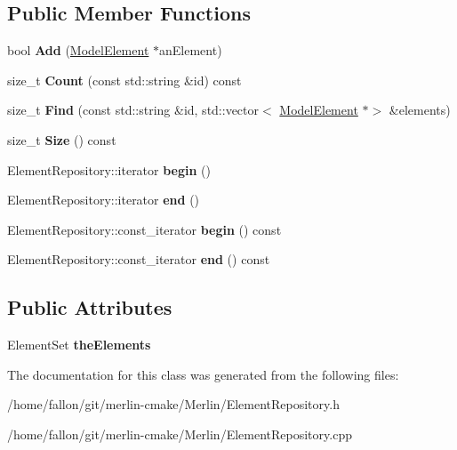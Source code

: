 \subsection*{Public Member Functions}
\begin{DoxyCompactItemize}
\item 
\mbox{\label{classElementRepository_a5c7dee409a53d501144a9cf5c6200e1e}} 
bool {\bfseries Add} (\hyperlink{classModelElement}{Model\+Element} $\ast$an\+Element)
\item 
\mbox{\label{classElementRepository_a48528e41abe5ed8a121db383ead83f63}} 
size\+\_\+t {\bfseries Count} (const std\+::string \&id) const
\item 
\mbox{\label{classElementRepository_ae8833698c1c4efa1fffd01547d9166dd}} 
size\+\_\+t {\bfseries Find} (const std\+::string \&id, std\+::vector$<$ \hyperlink{classModelElement}{Model\+Element} $\ast$$>$ \&elements)
\item 
\mbox{\label{classElementRepository_a3fc873824d592ab3a60964de5f32691f}} 
size\+\_\+t {\bfseries Size} () const
\item 
\mbox{\label{classElementRepository_a064256ae32d76ad39d96c931ab672b84}} 
Element\+Repository\+::iterator {\bfseries begin} ()
\item 
\mbox{\label{classElementRepository_a486611a7bbecfa3af43d21e8193eb8f9}} 
Element\+Repository\+::iterator {\bfseries end} ()
\item 
\mbox{\label{classElementRepository_afd781833fb84125ff0ece3174785b554}} 
Element\+Repository\+::const\+\_\+iterator {\bfseries begin} () const
\item 
\mbox{\label{classElementRepository_ae5268cb7a343889091f8fb4eccab2403}} 
Element\+Repository\+::const\+\_\+iterator {\bfseries end} () const
\end{DoxyCompactItemize}
\subsection*{Public Attributes}
\begin{DoxyCompactItemize}
\item 
\mbox{\label{classElementRepository_a091e41cbcced653eb54c59531e0db8fa}} 
Element\+Set {\bfseries the\+Elements}
\end{DoxyCompactItemize}


The documentation for this class was generated from the following files\+:\begin{DoxyCompactItemize}
\item 
/home/fallon/git/merlin-\/cmake/\+Merlin/Element\+Repository.\+h\item 
/home/fallon/git/merlin-\/cmake/\+Merlin/Element\+Repository.\+cpp\end{DoxyCompactItemize}
